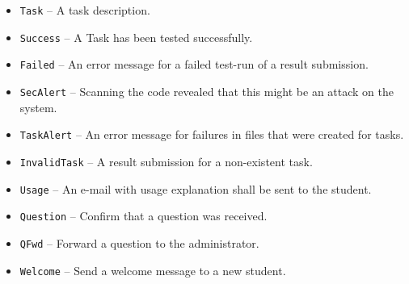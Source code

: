 \begin{description}
\begin{itemize}
            \begin{itemize}
            \item {\tt Task} -- A task description.
            \item {\tt Success} -- A Task has been tested successfully.
            \item {\tt Failed} -- An error message for a failed test-run of a result submission.
            \item {\tt SecAlert} -- Scanning the code revealed that this might be an attack on the system.
            \item {\tt TaskAlert} -- An error message for failures in files that were created for tasks.
            \item {\tt InvalidTask} -- A result submission for a non-existent task.
            \item {\tt Usage} -- An e-mail with usage explanation shall be sent to the student. 
            \item {\tt Question} -- Confirm that a question was received.
            \item {\tt QFwd} -- Forward a question to the administrator.
            \item {\tt Welcome} -- Send a welcome message to a new student.
            \end{itemize}


\end{itemize}
\end{description}
